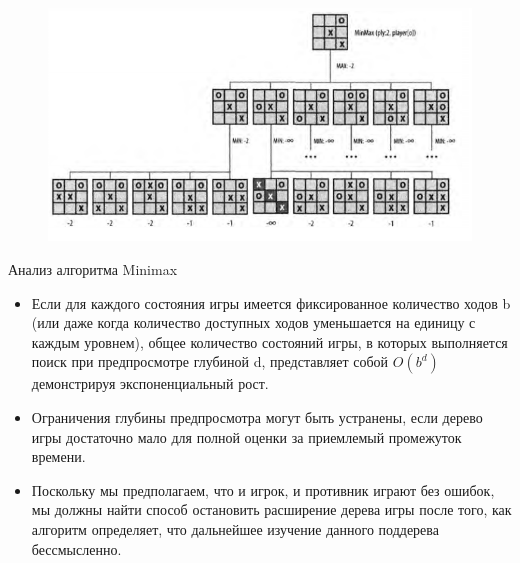 \documentclass{beamer}
\begin{document}
\begin{frame}
\begin{figure}[h]
\centering
\includegraphics[scale=0.6]{images/lec05-pic04.png}
\end{figure}
\end{frame}

\begin{frame}{Анализ алгоритма Minimax}
\begin{itemize}
\item Если для каждого состояния игры имеется фиксированное количество ходов b
(или даже когда количество доступных ходов уменьшается на единицу с каждым
уровнем), общее количество состояний игры, в которых выполняется поиск при
предпросмотре глубиной d, представляет собой $O(b^d)$ демонстрируя экспоненциальный рост. 
\item Ограничения глубины предпросмотра могут быть устранены, если дерево
игры достаточно мало для полной оценки за приемлемый промежуток времени.
\item Поскольку мы предполагаем, что и игрок, и противник играют
без ошибок, мы должны найти способ остановить расширение дерева игры после
того, как алгоритм определяет, что дальнейшее изучение данного поддерева бессмысленно.
\end{itemize}
\end{frame}
\end{document}
